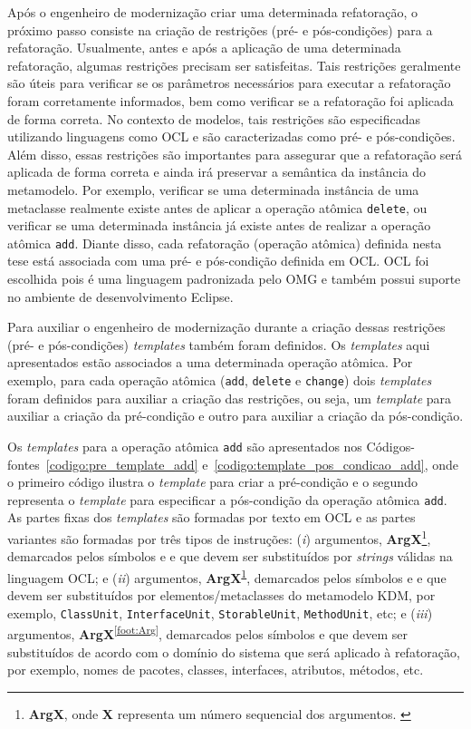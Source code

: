 Após o engenheiro de modernização criar uma determinada refatoração, o próximo passo consiste na criação de restrições (pré- e pós-condições) para a refatoração. Usualmente, antes e após a aplicação de uma determinada refatoração, algumas restrições precisam ser satisfeitas. Tais restrições geralmente são úteis para verificar se os parâmetros necessários para executar a refatoração foram corretamente informados, bem como verificar se a refatoração foi aplicada de forma correta. No contexto de modelos, tais restrições são especificadas utilizando linguagens como OCL e são caracterizadas como pré- e pós-condições. Além disso, essas restrições são importantes para assegurar que a refatoração será aplicada de forma correta e ainda irá preservar a semântica da instância do metamodelo. Por exemplo, verificar se uma determinada instância de uma metaclasse realmente existe antes de aplicar a operação atômica \texttt{delete}, ou verificar se uma determinada instância já existe antes de realizar a operação atômica \texttt{add}. Diante disso, cada refatoração (operação atômica) definida nesta tese está associada com uma pré- e pós-condição definida em OCL. OCL foi escolhida pois é uma linguagem padronizada pelo OMG e também possui suporte no ambiente de desenvolvimento Eclipse.

Para auxiliar o engenheiro de modernização durante a criação dessas restrições (pré- e pós-condições) \textit{templates} também foram definidos. Os \textit{templates} aqui apresentados estão associados a uma determinada operação atômica. Por exemplo, para cada operação atômica (\texttt{add}, \texttt{delete} e \texttt{change}) dois \textit{templates} foram definidos para auxiliar a criação das restrições, ou seja, um \textit{template} para auxiliar a criação da pré-condição e outro para auxiliar a criação da pós-condição.

Os \textit{templates} para a operação atômica \texttt{add} são apresentados nos Códigos-fontes~\ref{codigo:pre_template_add} e~\ref{codigo:template_pos_condicao_add}, onde o primeiro código ilustra o \textit{template} para criar a pré-condição e o segundo representa o \textit{template} para especificar a pós-condição da operação atômica \texttt{add}. As partes fixas dos \textit{templates} são formadas por texto em OCL e as partes variantes são formadas por três tipos de instruções: (\textit{i}) argumentos, \textbf{ArgX}\footnote{\textbf{ArgX}, onde \textbf{X} representa um número sequencial dos argumentos. \label{foot:Arg1}}, demarcados pelos símbolos \aspas{\textbf{<\#}} e \aspas{\textbf{\#>}} e que devem ser substituídos por \textit{strings} válidas na linguagem OCL; e (\textit{ii}) argumentos, \textbf{ArgX}\textsuperscript{\ref{foot:Arg1}}, demarcados pelos símbolos \aspas{\textbf{<\%}} e \aspas{\textbf{\%>}} e que devem ser substituídos por elementos/metaclasses do metamodelo KDM, por exemplo, \texttt{ClassUnit}, \texttt{InterfaceUnit}, \texttt{StorableUnit}, \texttt{MethodUnit}, etc; e (\textit{iii}) argumentos, \textbf{ArgX}\textsuperscript{\ref{foot:Arg}}, demarcados pelos símbolos  e  que devem ser substituídos de acordo com o domínio do sistema que será aplicado à refatoração, por exemplo, nomes de pacotes, classes, interfaces, atributos, métodos, etc.  

